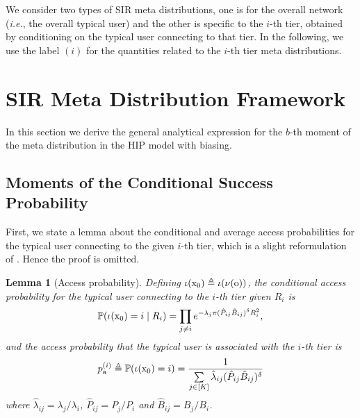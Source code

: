 \documentclass[12pt,draftclsnofoot,journal,onecolumn]{IEEEtran}
\def\P{\mathbb{P}}
\def\ie{{\em i.e.}}
\newtheorem{lemma}{Lemma}
\begin{document}
We consider two types of SIR meta distributions, one is for the overall network (\ie, the overall typical user) and the other is specific to the $i$-th tier, obtained by conditioning on the typical user connecting to that tier. In the following, we use the label $(i)$ for the quantities related to the $i$-th tier meta distributions.

\section{SIR Meta Distribution Framework}\label{sec:MainResults}
In this section we derive the general analytical expression for the $b$-th moment of the meta distribution in the HIP model with biasing.   

\subsection{Moments of the Conditional Success Probability}
First, we state a lemma about the conditional and average access probabilities for the typical user connecting to the given $i$-th tier, which is a slight reformulation of \cite[Lemma 1]{Jo12}. Hence the proof is omitted.
\allowdisplaybreaks
\begin{lemma}[Access probability]
	\label{lem:AccessProb}
	Defining $\iota(\rm x_0)\triangleq\iota(\nu(o))$, the conditional access probability for the typical user connecting to the $i$-th tier given $R_i$ is
	\begin{equation}\label{eq:condi_acc_Prob}
	\P(\iota({\rm x_0})=i \mid R_i) = \prod_{j\neq i} e^{-\lambda_j \pi ({\hat P_{ij}} {\hat B_{ij}})^{\delta} R_i^2},
	\end{equation}	
	and the access probability that the typical user is associated with the $i$-th tier is 
	\begin{equation}\label{eq:AccessProb}
	p_{\rm a}^{(i)}\triangleq\P(\iota({\rm x_0})=i) = \frac{1}{\sum\limits_{j\in[K]} \hat{\lambda}_{ij}(\hat{P}_{ij}\hat{B}_{ij})^\delta} 
	\end{equation}
	where $\hat\lambda_{ij} = \lambda_j/\lambda_i$, $\hat P_{ij} = P_j/P_i$ and $\hat B_{ij} = B_j/B_i$.
\end{lemma}  
\end{document}
